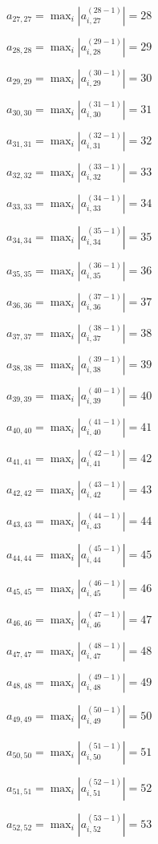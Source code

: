 \documentclass[a4paper,12pt]{article}
\begin{document}
$a _{ 27, 27 } =  \max _i |a _{ i, 27 } ^{ (28 - 1) } | = 28$

$a _{ 28, 28 } =  \max _i |a _{ i, 28 } ^{ (29 - 1) } | = 29$

$a _{ 29, 29 } =  \max _i |a _{ i, 29 } ^{ (30 - 1) } | = 30$

$a _{ 30, 30 } =  \max _i |a _{ i, 30 } ^{ (31 - 1) } | = 31$

$a _{ 31, 31 } =  \max _i |a _{ i, 31 } ^{ (32 - 1) } | = 32$

$a _{ 32, 32 } =  \max _i |a _{ i, 32 } ^{ (33 - 1) } | = 33$

$a _{ 33, 33 } =  \max _i |a _{ i, 33 } ^{ (34 - 1) } | = 34$

$a _{ 34, 34 } =  \max _i |a _{ i, 34 } ^{ (35 - 1) } | = 35$

$a _{ 35, 35 } =  \max _i |a _{ i, 35 } ^{ (36 - 1) } | = 36$

$a _{ 36, 36 } =  \max _i |a _{ i, 36 } ^{ (37 - 1) } | = 37$

$a _{ 37, 37 } =  \max _i |a _{ i, 37 } ^{ (38 - 1) } | = 38$

$a _{ 38, 38 } =  \max _i |a _{ i, 38 } ^{ (39 - 1) } | = 39$

$a _{ 39, 39 } =  \max _i |a _{ i, 39 } ^{ (40 - 1) } | = 40$

$a _{ 40, 40 } =  \max _i |a _{ i, 40 } ^{ (41 - 1) } | = 41$

$a _{ 41, 41 } =  \max _i |a _{ i, 41 } ^{ (42 - 1) } | = 42$

$a _{ 42, 42 } =  \max _i |a _{ i, 42 } ^{ (43 - 1) } | = 43$

$a _{ 43, 43 } =  \max _i |a _{ i, 43 } ^{ (44 - 1) } | = 44$

$a _{ 44, 44 } =  \max _i |a _{ i, 44 } ^{ (45 - 1) } | = 45$

$a _{ 45, 45 } =  \max _i |a _{ i, 45 } ^{ (46 - 1) } | = 46$

$a _{ 46, 46 } =  \max _i |a _{ i, 46 } ^{ (47 - 1) } | = 47$

$a _{ 47, 47 } =  \max _i |a _{ i, 47 } ^{ (48 - 1) } | = 48$

$a _{ 48, 48 } =  \max _i |a _{ i, 48 } ^{ (49 - 1) } | = 49$

$a _{ 49, 49 } =  \max _i |a _{ i, 49 } ^{ (50 - 1) } | = 50$

$a _{ 50, 50 } =  \max _i |a _{ i, 50 } ^{ (51 - 1) } | = 51$

$a _{ 51, 51 } =  \max _i |a _{ i, 51 } ^{ (52 - 1) } | = 52$

$a _{ 52, 52 } =  \max _i |a _{ i, 52 } ^{ (53 - 1) } | = 53$
\end{document}
